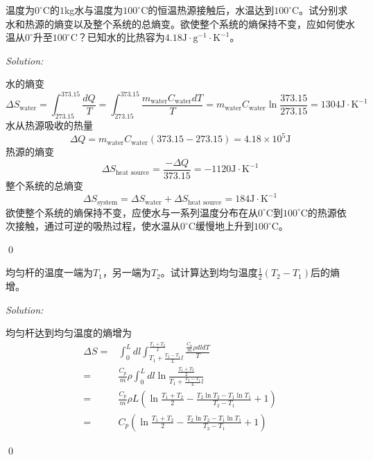 \documentclass[12pt,a4paper]{article}
\newenvironment{problem}[2][Problem]{\begin{trivlist}
\item[\hskip \labelsep {\bfseries #1}\hskip \labelsep {\bfseries #2.}]}{\end{trivlist}}
\newenvironment{sol}
    {\emph{Solution:}
    }
    {
    \qed
    }
\begin{document}
\begin{problem}{1-17}
温度为$0^{\circ}$C的$1$kg水与温度为$100^{\circ}$C的恒温热源接触后，水温达到$100^{\circ}$C。试分别求水和热源的熵变以及整个系统的总熵变。欲使整个系统的熵保持不变，应如何使水温从$0^{\circ}$升至$100^{\circ}$C？已知水的比热容为$4.18\text{J}\cdot\text{g}^{-1}\cdot\text{K}^{-1}$。
\end{problem}
\begin{sol}
水的熵变
\begin{equation}
\Delta S_{\text{water}}=\int_{273.15}^{373.15}\frac{dQ}{T}=\int_{273.15}^{373.15}\frac{m_{\text{water}}C_{\text{water}}dT}{T}=m_{\text{water}}C_{\text{water}}\ln\frac{373.15}{273.15}=1304\text{J}\cdot\text{K}^{-1}
\end{equation}
水从热源吸收的热量
\begin{equation}
\Delta Q=m_{\text{water}}C_{\text{water}}(373.15-273.15)=4.18\times10^5\text{J}
\end{equation}
热源的熵变
\begin{equation}
\Delta S_{\text{heat source}}=\frac{-\Delta Q}{373.15}=-1120\text{J}\cdot\text{K}^{-1}
\end{equation}
整个系统的总熵变
\begin{equation}
\Delta S_{\text{system}}=\Delta S_{\text{water}}+\Delta S_{\text{heat source}}=184\text{J}\cdot\text{K}^{-1}
\end{equation}
欲使整个系统的熵保持不变，应使水与一系列温度分布在从$0^{\circ}$C到$100^{\circ}$C的热源依次接触，通过可逆的吸热过程，使水温从$0^{\circ}$C缓慢地上升到$100^{\circ}$C。
\end{sol}

\begin{problem}{1-19}
均匀杆的温度一端为$T_1$，另一端为$T_2$。试计算达到均匀温度$\frac{1}{2}(T_2-T_1)$后的熵增。
\end{problem}
\begin{sol}
均匀杆达到均匀温度的熵增为
\begin{align}
\nonumber\Delta S=&\int_0^Ldl\int_{T_1+\frac{T_2-T_1}{L}l}^{\frac{T_1+T_2}{2}}\frac{\frac{C_p}{m}\rho dldT}{T}\\
\nonumber=&\frac{C_p}{m}\rho\int_0^Ldl\ln\frac{\frac{T_1+T_2}{2}}{T_1+\frac{T_2-T_1}{L}l}\\
\nonumber=&\frac{C_p}{m}\rho L\left(\ln\frac{T_1+T_2}{2}-\frac{T_2\ln T_2-T_1\ln T_1}{T_2-T_1}+1\right)\\
=&C_p\left(\ln\frac{T_1+T_2}{2}-\frac{T_2\ln T_2-T_1\ln T_1}{T_2-T_1}+1\right)
\end{align}
\end{sol}
\end{document}
